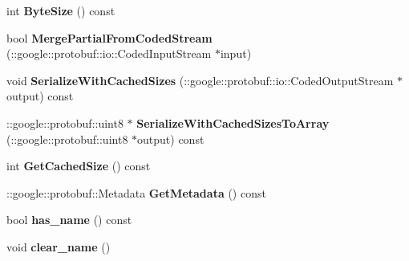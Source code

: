 \begin{DoxyCompactItemize}
\item 
\hypertarget{classSimpleChat_1_1UserJoinRequest_aa14f063d5d75fbec1b2b5f73a94d4bb7}{int {\bfseries Byte\-Size} () const }\label{classSimpleChat_1_1UserJoinRequest_aa14f063d5d75fbec1b2b5f73a94d4bb7}

\item 
\hypertarget{classSimpleChat_1_1UserJoinRequest_afbe311545f5d9162e81afb317c781092}{bool {\bfseries Merge\-Partial\-From\-Coded\-Stream} (\-::google\-::protobuf\-::io\-::\-Coded\-Input\-Stream $\ast$input)}\label{classSimpleChat_1_1UserJoinRequest_afbe311545f5d9162e81afb317c781092}

\item 
\hypertarget{classSimpleChat_1_1UserJoinRequest_a2f379a15168279f746bc4001b2c13e6c}{void {\bfseries Serialize\-With\-Cached\-Sizes} (\-::google\-::protobuf\-::io\-::\-Coded\-Output\-Stream $\ast$output) const }\label{classSimpleChat_1_1UserJoinRequest_a2f379a15168279f746bc4001b2c13e6c}

\item 
\hypertarget{classSimpleChat_1_1UserJoinRequest_a878da632abfb31d553d1b400b8f45a52}{\-::google\-::protobuf\-::uint8 $\ast$ {\bfseries Serialize\-With\-Cached\-Sizes\-To\-Array} (\-::google\-::protobuf\-::uint8 $\ast$output) const }\label{classSimpleChat_1_1UserJoinRequest_a878da632abfb31d553d1b400b8f45a52}

\item 
\hypertarget{classSimpleChat_1_1UserJoinRequest_a2b55ab3707e95fef478dbb684b170f1a}{int {\bfseries Get\-Cached\-Size} () const }\label{classSimpleChat_1_1UserJoinRequest_a2b55ab3707e95fef478dbb684b170f1a}

\item 
\hypertarget{classSimpleChat_1_1UserJoinRequest_a6d8bf1219cb5c587c2a4950895bfa0b5}{\-::google\-::protobuf\-::\-Metadata {\bfseries Get\-Metadata} () const }\label{classSimpleChat_1_1UserJoinRequest_a6d8bf1219cb5c587c2a4950895bfa0b5}

\item 
\hypertarget{classSimpleChat_1_1UserJoinRequest_a66d93d16639994f13157c9481451149b}{bool {\bfseries has\-\_\-name} () const }\label{classSimpleChat_1_1UserJoinRequest_a66d93d16639994f13157c9481451149b}

\item 
\hypertarget{classSimpleChat_1_1UserJoinRequest_a946ed8a97f22650e2880c26937f568b1}{void {\bfseries clear\-\_\-name} ()}\label{classSimpleChat_1_1UserJoinRequest_a946ed8a97f22650e2880c26937f568b1}


\end{DoxyCompactItemize}
